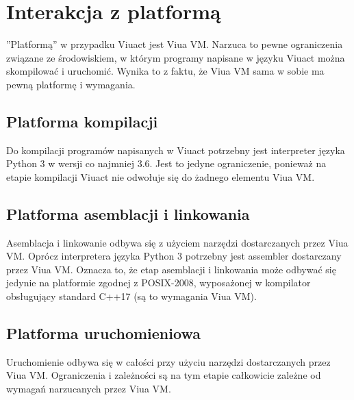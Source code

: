 \newpage
\section{Interakcja z platformą}

''Platformą'' w przypadku Viuact jest Viua VM. Narzuca to pewne ograniczenia związane ze środowiskiem, w
którym programy napisane w języku Viuact można skompilować i uruchomić. Wynika to z faktu, że Viua VM sama w
sobie ma pewną platformę i wymagania.

\subsection{Platforma kompilacji}

Do kompilacji programów napisanych w Viuact potrzebny jest interpreter języka Python 3 w wersji co najmniej
3.6. Jest to jedyne ograniczenie, ponieważ na etapie kompilacji Viuact nie odwołuje się do żadnego elementu
Viua VM.

\subsection{Platforma asemblacji i linkowania}

Asemblacja i linkowanie odbywa się z użyciem narzędzi dostarczanych przez Viua VM.
Oprócz interpretera języka Python 3 potrzebny jest assembler dostarczany przez Viua VM. Oznacza to, że etap
asemblacji i linkowania może odbywać się jedynie na platformie zgodnej z POSIX-2008, wyposażonej w kompilator
obsługujący standard C++17 (są to wymagania Viua VM).

\subsection{Platforma uruchomieniowa}

Uruchomienie odbywa się w całości przy użyciu narzędzi dostarczanych przez Viua VM.
Ograniczenia i zależności są na tym etapie całkowicie zależne od wymagań narzucanych przez Viua VM.
